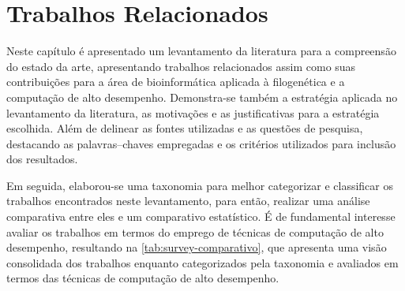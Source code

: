 \documentclass[english,brazilian]{UNISINOSmonografia} %
\begin{document}
\chapter{Trabalhos Relacionados}
\label{ch:relacionados}







Neste capítulo é apresentado um levantamento da literatura para a compreensão do estado da arte, apresentando trabalhos relacionados assim como suas contribuições para a área de bioinformática aplicada à filogenética e a computação de alto desempenho.
%
Demonstra-se também a estratégia aplicada no levantamento da literatura, as motivações e as justificativas para a estratégia escolhida. Além de delinear as fontes utilizadas e as questões de pesquisa, destacando as palavras--chaves empregadas e os critérios utilizados para inclusão dos resultados.


Em seguida, elaborou-se uma taxonomia para melhor categorizar e classificar os trabalhos encontrados neste levantamento, para então, realizar uma análise comparativa entre eles e um comparativo estatístico. É de fundamental interesse avaliar os trabalhos em termos do emprego de técnicas de computação de alto desempenho, resultando na \autoref{tab:survey-comparativo}, que apresenta uma visão consolidada dos trabalhos enquanto categorizados pela taxonomia e avaliados em termos das técnicas de computação de alto desempenho.
\end{document}
